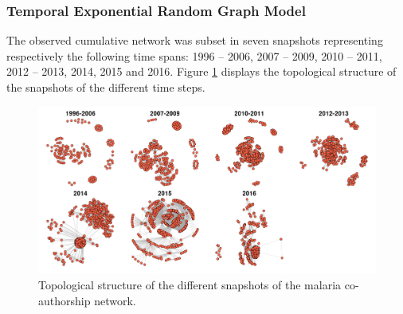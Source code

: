\pagebreak
\subsubsection{Temporal Exponential Random Graph Model}
\label{sec:malaria_results_tergm}
The observed cumulative network was subset in seven snapshots representing respectively the following time spans: 1996 -- 2006, 2007 -- 2009, 2010 -- 2011, 2012 -- 2013, 2014, 2015 and 2016. %
Figure \ref{fig:malaria_dynNetwork} displays the topological structure of the snapshots of the different time steps.

\begin{figure}[!ht]
\hspace{-1.25cm}
\includegraphics[scale=0.4]{Chapters/malaria/statMod/dynMNet2}
\caption{Topological structure of the different snapshots of the malaria co-authorship network.}
\label{fig:malaria_dynNetwork}
\end{figure}

